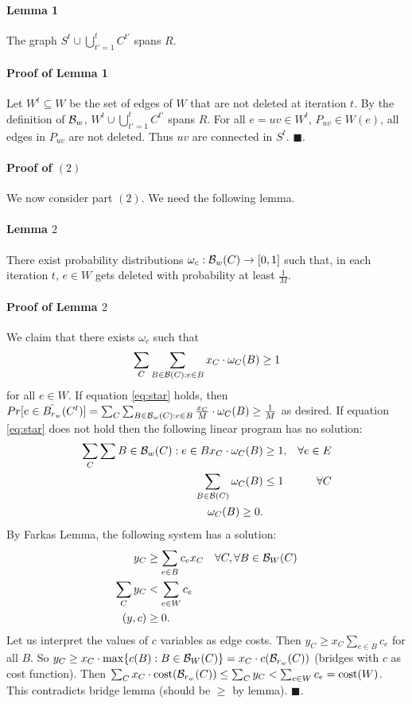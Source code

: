 \documentclass[letterpaper,12pt,oneside,onecolumn]{article}
\begin{document}
\paragraph{Lemma 1}
The graph $S^t \cup \bigcup_{t' = 1} ^t C^{t'}$ spans $R$.
\paragraph{Proof of Lemma 1}
Let $W^t \subseteq W$ be the set of edges of $W$ that are not deleted at iteration $t$. By the definition of $\mathcal{B}_w$, $W^t \cup \bigcup_{t' = 1} ^t C^{t'}$ spans $R$. For all $e = uv \in W^t$, $P_{uv} \in W(e)$, all edges in $P_{uv}$ are not deleted. Thus $uv$ are connected in $S^t$. $\blacksquare$.
\paragraph{Proof of $(2)$}
We now consider part $(2)$. We need the following lemma.
\paragraph{Lemma $2$}
There exist probability distributions $\omega_c: \mathcal{B}_w(C) \rightarrow [0,1]$ such that, in each iteration $t$, $e \in W$ gets deleted with probability at least $\frac{1}{M}$.
\paragraph{Proof of Lemma $2$}
We claim that there exists $\omega_c$ such that
\begin{equation}\label{eq:star}\sum_C \sum_{B \in \mathcal{B}(C) : e\in B} x_C \cdot \omega_C (B) \geq 1\end{equation}
for all $e \in W$. If equation \ref{eq:star} holds, then $Pr[e \in \bar{B_{r_w}} (C^t)] = \sum_{C} \sum_{B\in \mathcal{B}_w(C) : e \in B} \frac{x_C}{M} \cdot \omega_C(B) \geq \frac{1}{M}$ as desired. If equation \ref{eq:star} does not hold then the following linear program has no solution:
\begin{align*}
\sum_{C}\sum{B \in \mathcal{B}_w(C): e\in B}x_C \cdot \omega_C(B) &\geq 1, &\forall e \in E\\
\sum_{B \in \mathcal{B}(C)} \omega_C(B) &\leq 1 &\forall C \\
\omega_C(B) \geq 0.
\end{align*}
By Farkas Lemma, the following system has a solution:
\begin{align*}
y_C &\geq \sum_{e \in B} c_e x_C &\forall C, \forall B \in \mathcal{B}_W(C) \\
\sum_C y_C &< \sum_{e \in W} c_e\\
(y,c) &\geq 0.
\end{align*}
Let us interpret the values of $c$ variables as edge costs. Then $y_C \geq x_C \sum_{e \in B} c_e$ for all $B$. So $y_C \geq x_C \cdot \max\{c(B) : B \in \mathcal{B}_W(C)\} = x_C \cdot c(\mathcal{B}_{r_w}(C))$ (bridges with $c$ as cost function). Then $\sum_C x_C\cdot \text{cost}(\mathcal{B}_{r_w}(C)) \leq \sum_{C} y_C < \sum_{e\in W} c_e = \text{cost}(W)$. This contradicts bridge lemma (should be $\geq$ by lemma). $\blacksquare$.
\end{document}
